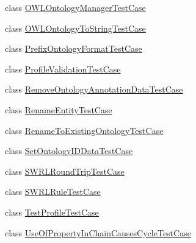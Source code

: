 \begin{DoxyCompactItemize}
\item 
class \hyperlink{classorg_1_1semanticweb_1_1owlapi_1_1api_1_1test_1_1ontology_1_1_o_w_l_ontology_manager_test_case}{O\-W\-L\-Ontology\-Manager\-Test\-Case}
\item 
class \hyperlink{classorg_1_1semanticweb_1_1owlapi_1_1api_1_1test_1_1ontology_1_1_o_w_l_ontology_to_string_test_case}{O\-W\-L\-Ontology\-To\-String\-Test\-Case}
\item 
class \hyperlink{classorg_1_1semanticweb_1_1owlapi_1_1api_1_1test_1_1ontology_1_1_prefix_ontology_format_test_case}{Prefix\-Ontology\-Format\-Test\-Case}
\item 
class \hyperlink{classorg_1_1semanticweb_1_1owlapi_1_1api_1_1test_1_1ontology_1_1_profile_validation_test_case}{Profile\-Validation\-Test\-Case}
\item 
class \hyperlink{classorg_1_1semanticweb_1_1owlapi_1_1api_1_1test_1_1ontology_1_1_remove_ontology_annotation_data_test_case}{Remove\-Ontology\-Annotation\-Data\-Test\-Case}
\item 
class \hyperlink{classorg_1_1semanticweb_1_1owlapi_1_1api_1_1test_1_1ontology_1_1_rename_entity_test_case}{Rename\-Entity\-Test\-Case}
\item 
class \hyperlink{classorg_1_1semanticweb_1_1owlapi_1_1api_1_1test_1_1ontology_1_1_rename_to_existing_ontology_test_case}{Rename\-To\-Existing\-Ontology\-Test\-Case}
\item 
class \hyperlink{classorg_1_1semanticweb_1_1owlapi_1_1api_1_1test_1_1ontology_1_1_set_ontology_i_d_data_test_case}{Set\-Ontology\-I\-D\-Data\-Test\-Case}
\item 
class \hyperlink{classorg_1_1semanticweb_1_1owlapi_1_1api_1_1test_1_1ontology_1_1_s_w_r_l_round_trip_test_case}{S\-W\-R\-L\-Round\-Trip\-Test\-Case}
\item 
class \hyperlink{classorg_1_1semanticweb_1_1owlapi_1_1api_1_1test_1_1ontology_1_1_s_w_r_l_rule_test_case}{S\-W\-R\-L\-Rule\-Test\-Case}
\item 
class \hyperlink{classorg_1_1semanticweb_1_1owlapi_1_1api_1_1test_1_1ontology_1_1_test_profile_test_case}{Test\-Profile\-Test\-Case}
\item 
class \hyperlink{classorg_1_1semanticweb_1_1owlapi_1_1api_1_1test_1_1ontology_1_1_use_of_property_in_chain_causes_cycle_test_case}{Use\-Of\-Property\-In\-Chain\-Causes\-Cycle\-Test\-Case}
\end{DoxyCompactItemize}
